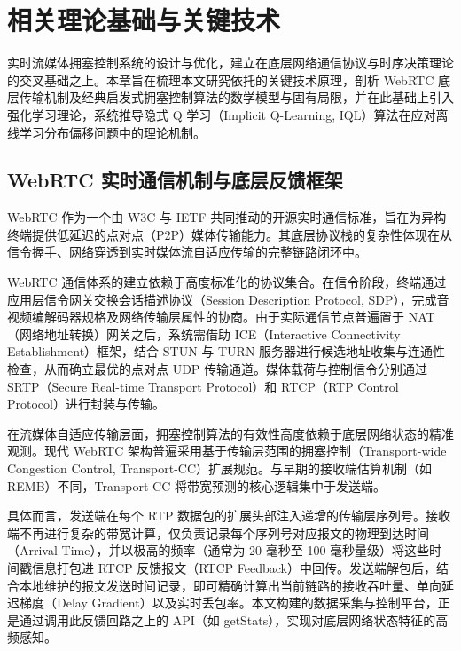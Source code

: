 \chapter{相关理论基础与关键技术}

实时流媒体拥塞控制系统的设计与优化，建立在底层网络通信协议与时序决策理论的交叉基础之上。本章旨在梳理本文研究依托的关键技术原理，剖析 WebRTC 底层传输机制及经典启发式拥塞控制算法的数学模型与固有局限，并在此基础上引入强化学习理论，系统推导隐式 Q 学习（Implicit Q-Learning, IQL）算法在应对离线学习分布偏移问题中的理论机制。

\section{WebRTC 实时通信机制与底层反馈框架}
\label{sec:webrtc-framework}
WebRTC 作为一个由 W3C 与 IETF 共同推动的开源实时通信标准，旨在为异构终端提供低延迟的点对点（P2P）媒体传输能力。其底层协议栈的复杂性体现在从信令握手、网络穿透到实时媒体流自适应传输的完整链路闭环中。
\par WebRTC 通信体系的建立依赖于高度标准化的协议集合。在信令阶段，终端通过应用层信令网关交换会话描述协议（Session Description Protocol, SDP），完成音视频编解码器规格及网络传输层属性的协商。由于实际通信节点普遍置于 NAT（网络地址转换）网关之后，系统需借助 ICE（Interactive Connectivity Establishment）框架\cite{Keranen2018ICE}，结合 STUN 与 TURN 服务器进行候选地址收集与连通性检查，从而确立最优的点对点 UDP 传输通道。媒体载荷与控制信令分别通过 SRTP（Secure Real-time Transport Protocol）和 RTCP（RTP Control Protocol）\cite{Schulzrinne2003RTP}进行封装与传输。
\par 在流媒体自适应传输层面，拥塞控制算法的有效性高度依赖于底层网络状态的精准观测。现代 WebRTC 架构普遍采用基于传输层范围的拥塞控制（Transport-wide Congestion Control, Transport-CC）扩展规范\cite{Sarker2021TransportCC}。与早期的接收端估算机制（如 REMB）不同，Transport-CC 将带宽预测的核心逻辑集中于发送端。
\par 具体而言，发送端在每个 RTP 数据包的扩展头部注入递增的传输层序列号。接收端不再进行复杂的带宽计算，仅负责记录每个序列号对应报文的物理到达时间（Arrival Time），并以极高的频率（通常为 20 毫秒至 100 毫秒量级）将这些时间戳信息打包进 RTCP 反馈报文（RTCP Feedback）中回传。发送端解包后，结合本地维护的报文发送时间记录，即可精确计算出当前链路的接收吞吐量、单向延迟梯度（Delay Gradient）以及实时丢包率。本文构建的数据采集与控制平台，正是通过调用此反馈回路之上的 API（如 getStats），实现对底层网络状态特征的高频感知。

